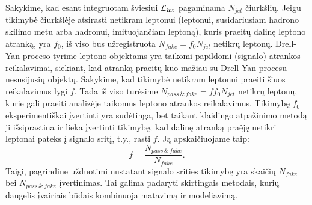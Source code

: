 \documentclass[a4paper, 12pt, oneside]{article}
\newcommand{\Lumi}{{\cal L}_\mathrm{int}}
\newlength\q
\begin{document}
Sakykime, kad esant integruotam šviesiui $\Lumi$ pagaminama $N_{jet}$ čiurkšlių.
Jeigu tikimybė čiurkšlėje atsirasti netikram leptonui (leptonui, susidariusiam hadrono skilimo metu arba hadronui, imituojančiam
leptoną), kuris praeitų dalinę leptono atranką, yra $f_0$, iš viso bus užregistruota $N_{fake}=f_0 N_{jet}$ netikrų leptonų.
Drell-Yan proceso tyrime leptono objektams yra taikomi papildomi (signalo) atrankos reikalavimai, siekiant, kad atranką praeitų kuo
mažiau su Drell-Yan procesu nesusijusių objektų.
Sakykime, kad tikimybė netikram leptonui praeiti šiuos reikalavimus lygi $f$.
Tada iš viso turėsime $N_{pass \,\&\, fake}=ff_0 N_{jet}$ netikrų leptonų, kurie gali praeiti analizėje taikomus leptono
atrankos reikalavimus.
Tikimybę $f_0$ eksperimentiškai įvertinti yra sudėtinga, bet taikant klaidingo atpažinimo metodą ji išsiprastina ir lieka
įvertinti tikimybę, kad dalinę atranką praėję netikri leptonai pateks į signalo sritį, t.y., rasti $f$.
Ją apskaičiuojame taip:
\begin{equation}
\label{eq:FRtheor}
	f = \frac{N_{pass \,\&\, fake}}{N_{fake}} .
\end{equation}
Taigi, pagrindine užduotimi nustatant signalo srities tikimybę yra skaičių $N_{fake}$ bei $N_{pass \,\&\, fake}$ įvertinimas.
Tai galima padaryti skirtingais metodais, kurių daugelis įvairiais būdais kombinuoja matavimą ir modeliavimą.
\end{document}
